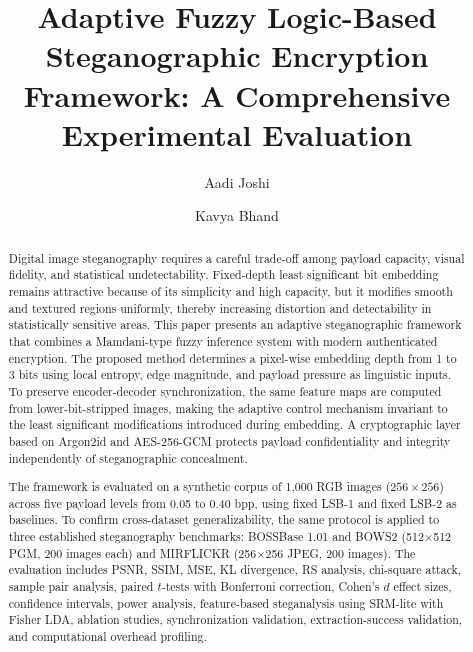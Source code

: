 \begin{frontmatter}

\title{Adaptive Fuzzy Logic-Based Steganographic Encryption Framework: A Comprehensive Experimental Evaluation}

\author[inst1]{Aadi Joshi}

\author[inst1]{Kavya Bhand}




\begin{abstract}
Digital image steganography requires a careful trade-off among payload capacity, visual fidelity, and statistical undetectability. Fixed-depth least significant bit embedding remains attractive because of its simplicity and high capacity, but it modifies smooth and textured regions uniformly, thereby increasing distortion and detectability in statistically sensitive areas. This paper presents an adaptive steganographic framework that combines a Mamdani-type fuzzy inference system with modern authenticated encryption. The proposed method determines a pixel-wise embedding depth from 1 to 3 bits using local entropy, edge magnitude, and payload pressure as linguistic inputs. To preserve encoder-decoder synchronization, the same feature maps are computed from lower-bit-stripped images, making the adaptive control mechanism invariant to the least significant modifications introduced during embedding. A cryptographic layer based on Argon2id and AES-256-GCM protects payload confidentiality and integrity independently of steganographic concealment.

The framework is evaluated on a synthetic corpus of 1,000 RGB images (\(256 \times 256\)) across five payload levels from 0.05 to 0.40 bpp, using fixed LSB-1 and fixed LSB-2 as baselines. To confirm cross-dataset generalizability, the same protocol is applied to three established steganography benchmarks: BOSSBase 1.01 and BOWS2 (512\(\times\)512 PGM, 200 images each) and MIRFLICKR (256\(\times\)256 JPEG, 200 images). The evaluation includes PSNR, SSIM, MSE, KL divergence, RS analysis, chi-square attack, sample pair analysis, paired \(t\)-tests with Bonferroni correction, Cohen's \(d\) effect sizes, confidence intervals, power analysis, feature-based steganalysis using SRM-lite with Fisher LDA, ablation studies, synchronization validation, extraction-success validation, and computational overhead profiling.


\end{abstract}
\end{frontmatter}
